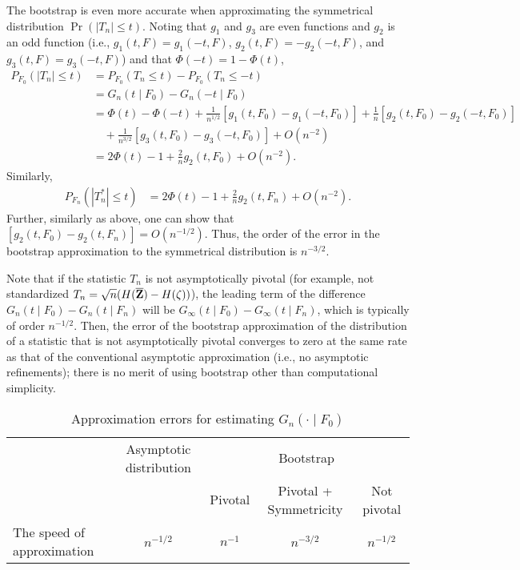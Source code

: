 \documentclass[11pt, A4paper, openany, uplatex]{book}
\begin{document}
The bootstrap is even more accurate when approximating the symmetrical distribution $\Pr(|T_n| \le t)$.
Noting that $g_1$ and $g_3$ are even functions and $g_2$ is an odd function (i.e., $g_1(t, F) = g_1(-t, F)$, $g_2(t, F) = - g_2(-t, F)$, and $g_3(t, F) = g_3(-t, F)$) and that $\Phi(-t) = 1 - \Phi(t)$,
\begin{align*}
	P_{F_0}(|T_n| \le t) 
	& = P_{F_0}(T_n \le t) -  P_{F_0}(T_n \le - t) \\
	& = G_n(t \mid F_0) - G_n( - t \mid F_0) \\
	& = \Phi(t) - \Phi(-t) + \frac{1}{n^{1/2}}[g_1(t, F_0) - g_1(-t, F_0)] + \frac{1}{n}[g_2(t, F_0) - g_2(-t, F_0)] \\
	& \quad + \frac{1}{n^{3/2}} [g_3(t, F_0) - g_3(-t, F_0)] + O(n^{-2}) \\
	& = 2 \Phi(t) - 1 + \frac{2}{n}g_2(t, F_0) + O(n^{-2}).
\end{align*}
Similarly,
\begin{align*}
	P_{F_n}(|T_n^*| \le t) 
	& = 2 \Phi(t) - 1 + \frac{2}{n}g_2(t, F_n) + O(n^{-2}).
\end{align*}
Further, similarly as above, one can show that $[g_2(t, F_0) - g_2(t, F_n)] = O(n^{-1/2})$.
Thus, the order of the error in the bootstrap approximation to the symmetrical distribution is $n^{-3/2}$.

Note that if the statistic $T_n$ is not asymptotically pivotal (for example, not standardized $T_n = \sqrt{n}(H(\overline{\mathbf{Z}}) - H(\zeta))$), the leading term of the difference $G_n(t \mid F_0) - G_n(t \mid F_n)$ will be $G_\infty(t \mid F_0) - G_\infty(t \mid F_n)$, which is typically of order $n^{-1/2}$.
Then, the error of the bootstrap approximation of the distribution
of a statistic that is not asymptotically pivotal converges to zero at the same rate as that of the conventional asymptotic approximation (i.e., no asymptotic refinements); there is no merit of using bootstrap other than  computational simplicity.

\begin{table}[h]
	\begin{tabular}{l|cccc}
		\hline
	& Asymptotic distribution     & \multicolumn{3}{c}{Bootstrap}    \\
    &                             & Pivotal                   & Pivotal + Symmetricity         & Not pivotal                 \\
		\hline
	The speed of approximation & $n^{-1/2}$ & $n^{-1}$ & $n^{-3/2}$ & $n^{-1/2}$ \\
		\hline
	\end{tabular}
	\caption{Approximation errors for estimating $G_n(\cdot \mid F_0)$}
\end{table}
\end{document}
